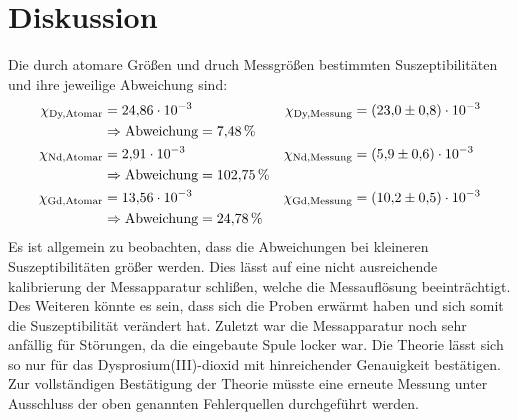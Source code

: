 \section{Diskussion}
\label{sec:Diskussion}
Die durch atomare Größen und druch Messgrößen bestimmten Suszeptibilitäten und ihre jeweilige Abweichung sind:
\begin{align*}
  \chi_\text{Dy,Atomar} &= \num{24.86e-3} & \chi_\text{Dy,Messung} &= \num{23.0\pm0.8e-3} \\
    & \Rightarrow \text{Abweichung} = \SI{7.48}{\percent} \\
  \chi_\text{Nd,Atomar} &= \num{2.91e-3} & \chi_\text{Nd,Messung} &= \num{5.9\pm0.6e-3} \\
    & \Rightarrow \text{Abweichung} = \SI{102.75}{\percent} \\
  \chi_\text{Gd,Atomar} &= \num{13.56e-3} & \chi_\text{Gd,Messung} &= \num{10.2\pm0.5e-3} \\
    & \Rightarrow \text{Abweichung} = \SI{24.78}{\percent}
\end{align*}
Es ist allgemein zu beobachten, dass die Abweichungen bei kleineren Suszeptibilitäten größer werden. Dies lässt auf eine nicht ausreichende kalibrierung
der Messapparatur schlißen, welche die Messauflösung beeinträchtigt.
Des Weiteren könnte es sein, dass sich die Proben erwärmt haben und sich somit die Suszeptibilität verändert hat. Zuletzt war die Messapparatur noch sehr
anfällig für Störungen, da die eingebaute Spule locker war.
Die Theorie lässt sich so nur für das Dysprosium(III)-dioxid mit hinreichender Genauigkeit bestätigen. Zur vollständigen Bestätigung der Theorie müsste eine
erneute Messung unter Ausschluss der oben genannten Fehlerquellen durchgeführt werden. 
